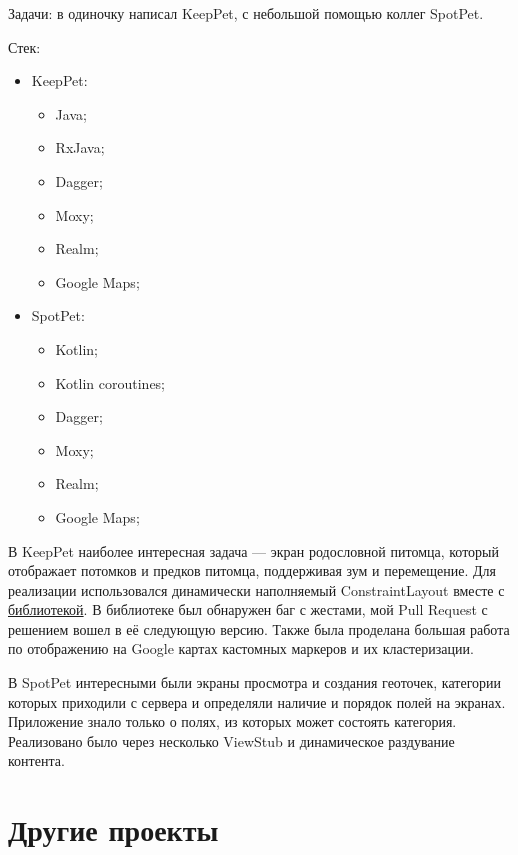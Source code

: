 \documentclass[a4paper,12pt]{article}
\begin{document}
    Задачи: в одиночку написал KeepPet, с небольшой помощью коллег SpotPet.

    Стек:
    \begin{itemize}
        \item KeepPet:
            \begin{itemize}
                \item Java;
                \item RxJava;
                \item Dagger;
                \item Moxy;
                \item Realm;
                \item Google Maps;
            \end{itemize}
        \item SpotPet:
            \begin{itemize}
                \item Kotlin;
                \item Kotlin coroutines;
                \item Dagger;
                \item Moxy;
                \item Realm;
                \item Google Maps;
            \end{itemize}
    \end{itemize}
    
    В KeepPet наиболее интересная задача --- экран родословной питомца, который отображает потомков и предков питомца, поддерживая зум и перемещение. Для реализации использовался динамически наполняемый ConstraintLayout вместе с \href{https://github.com/natario1/ZoomLayout}{библиотекой}. В библиотеке был обнаружен баг с жестами, мой Pull Request с решением вошел в её следующую версию. Также была проделана большая работа по отображению на Google картах  кастомных маркеров и их кластеризации.
    
    В SpotPet интересными были экраны просмотра и создания геоточек, категории которых приходили с сервера и определяли наличие и порядок полей на экранах. Приложение знало только о полях, из которых может состоять категория. Реализовано было через несколько ViewStub и динамическое раздувание контента.

    \section*{Другие проекты}
\end{document}
